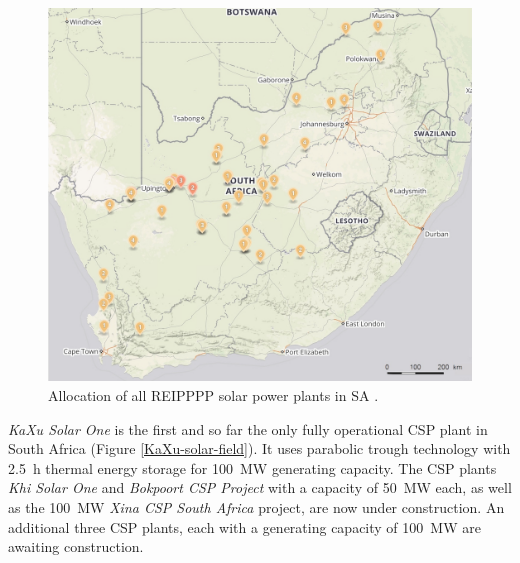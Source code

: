 \begin{figure}[h!]
\centering
\includegraphics[width=1\linewidth]{FIG/Solar-map}
\caption[Allocation of all REIPPPP solar power plants in SA.]{Allocation of all REIPPPP solar power plants in SA \cite{Forder2015}.}\label{Solar-map}
\end{figure}


\emph{KaXu Solar One} is the first and so far the only fully operational CSP plant in South Africa (Figure \ref{KaXu-solar-field}). It uses parabolic trough technology with \SI{2.5}{\hour} thermal energy storage for \SI{100}{\mega\watt} generating capacity. The CSP plants \emph{Khi Solar One} and \emph{Bokpoort CSP Project} with a capacity of \SI{50}{\mega\watt} each, as well as the \SI{100}{\mega\watt} \emph{Xina CSP South Africa} project, are now under construction. An additional three CSP plants, each with a generating capacity of \SI{100}{\mega\watt} are awaiting construction.

